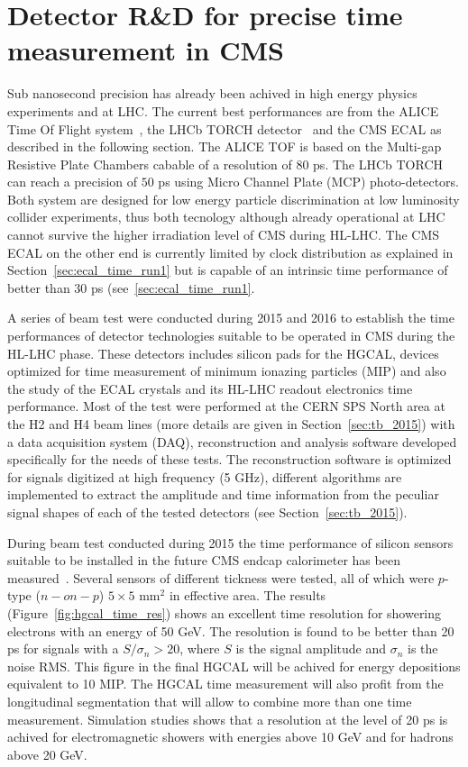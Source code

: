 \section{Detector R\&D for precise time measurement in CMS}
Sub nanosecond precision has already been achived in high energy physics experiments and at LHC.
The current best performances are from the ALICE Time Of Flight system~\cite{alice_tof}, the LHCb TORCH
detector~\cite{lhcb_torch} and the CMS ECAL as described in the following section. The ALICE TOF is
based on the Multi-gap Resistive Plate Chambers cabable of a resolution of $80$ ps. The LHCb TORCH
can reach a precision of $50$ ps using Micro Channel Plate (MCP) photo-detectors. Both system are
designed for low energy particle discrimination at low luminosity collider experiments, thus both tecnology
although already operational at LHC cannot survive the higher irradiation level of CMS during HL-LHC.
The CMS ECAL on the other end is currently limited by clock distribution as explained in Section~\ref{sec:ecal_time_run1}
but is capable of an intrinsic time performance of better than $30$ ps (see~\ref{sec:ecal_time_run1}.

A series of beam test were conducted during 2015 and 2016 to establish the time performances of detector
technologies suitable to be operated in CMS during the HL-LHC phase. These detectors includes silicon
pads for the HGCAL, devices optimized for time measurement of minimum ionazing particles (MIP) and also the study of
the ECAL \PbWO crystals and its HL-LHC readout electronics time performance. Most of the test were performed at
the CERN SPS North area at the H2 and H4 beam lines (more details are given in Section~\ref{sec:tb_2015}) with
a data acquisition system (DAQ), reconstruction and analysis software developed specifically for the needs of
these tests. The reconstruction software is optimized for signals digitized at high frequency (5 GHz),
different algorithms are implemented to extract the amplitude and time information from the peculiar signal shapes of
each of the tested detectors (see Section~\ref{sec:tb_2015}).

During beam test conducted during 2015 the time performance of silicon sensors suitable to be installed
in the future CMS endcap calorimeter has been measured~\cite{hgcal_tb_time}. Several sensors of different
tickness were tested, all of which were $p$-type ($n-on-p$) $5\times 5$ mm$^2$ in effective area.
The results (Figure~\ref{fig:hgcal_time_res}) shows an excellent time resolution for showering electrons with an
energy of 50 GeV. The resolution is found to be better than 20 ps for signals with a $S/\sigma_n > 20$,  where
$S$ is the signal amplitude and $\sigma_n$ is the noise RMS. This figure in the final HGCAL will be achived for
energy depositions equivalent to 10 MIP. The HGCAL time measurement will also profit from the longitudinal segmentation that will
allow to combine more than one time measurement. Simulation studies shows that a resolution at the level of 20 ps is
achived for electromagnetic showers with energies above 10 GeV and for hadrons above 20 GeV.

